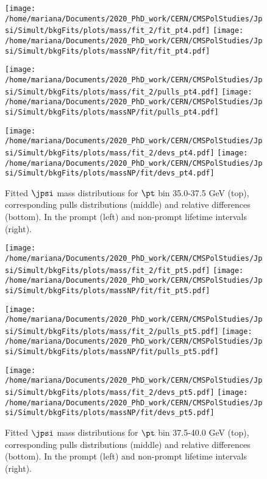 \pagebreak

\begin{figure}[h!]
\centering
\texttt{[image: /home/mariana/Documents/2020\_PhD\_work/CERN/CMSPolStudies/Jpsi/Simult/bkgFits/plots/mass/fit\_2/fit\_pt4.pdf]}
\texttt{[image: /home/mariana/Documents/2020\_PhD\_work/CERN/CMSPolStudies/Jpsi/Simult/bkgFits/plots/massNP/fit/fit\_pt4.pdf]}

\texttt{[image: /home/mariana/Documents/2020\_PhD\_work/CERN/CMSPolStudies/Jpsi/Simult/bkgFits/plots/mass/fit\_2/pulls\_pt4.pdf]}
\texttt{[image: /home/mariana/Documents/2020\_PhD\_work/CERN/CMSPolStudies/Jpsi/Simult/bkgFits/plots/massNP/fit/pulls\_pt4.pdf]}

\texttt{[image: /home/mariana/Documents/2020\_PhD\_work/CERN/CMSPolStudies/Jpsi/Simult/bkgFits/plots/mass/fit\_2/devs\_pt4.pdf]}
\texttt{[image: /home/mariana/Documents/2020\_PhD\_work/CERN/CMSPolStudies/Jpsi/Simult/bkgFits/plots/massNP/fit/devs\_pt4.pdf]}
\caption{Fitted $\jpsi$ mass distributions for $\pt$ bin 35.0-37.5 GeV (top), corresponding pulls distributions (middle) and relative differences (bottom). In the prompt (left) and non-prompt lifetime intervals (right).}\label{f:m_fit_4}
\end{figure}

\pagebreak

\begin{figure}[h!]
\centering
\texttt{[image: /home/mariana/Documents/2020\_PhD\_work/CERN/CMSPolStudies/Jpsi/Simult/bkgFits/plots/mass/fit\_2/fit\_pt5.pdf]}
\texttt{[image: /home/mariana/Documents/2020\_PhD\_work/CERN/CMSPolStudies/Jpsi/Simult/bkgFits/plots/massNP/fit/fit\_pt5.pdf]}

\texttt{[image: /home/mariana/Documents/2020\_PhD\_work/CERN/CMSPolStudies/Jpsi/Simult/bkgFits/plots/mass/fit\_2/pulls\_pt5.pdf]}
\texttt{[image: /home/mariana/Documents/2020\_PhD\_work/CERN/CMSPolStudies/Jpsi/Simult/bkgFits/plots/massNP/fit/pulls\_pt5.pdf]}

\texttt{[image: /home/mariana/Documents/2020\_PhD\_work/CERN/CMSPolStudies/Jpsi/Simult/bkgFits/plots/mass/fit\_2/devs\_pt5.pdf]}
\texttt{[image: /home/mariana/Documents/2020\_PhD\_work/CERN/CMSPolStudies/Jpsi/Simult/bkgFits/plots/massNP/fit/devs\_pt5.pdf]}
\caption{Fitted $\jpsi$ mass distributions for $\pt$ bin 37.5-40.0 GeV (top), corresponding pulls distributions (middle) and relative differences (bottom). In the prompt (left) and non-prompt lifetime intervals (right).}\label{f:m_fit_5}
\end{figure}

